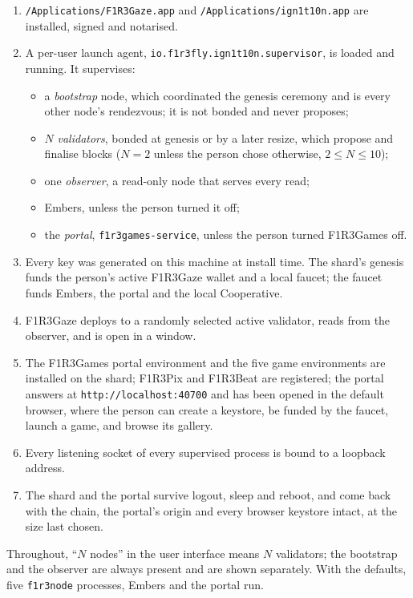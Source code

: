\documentclass[11pt]{article}
\theoremstyle{definition}
\theoremstyle{remark}
\newcommand{\code}[1]{\texttt{#1}}
\newcommand{\Gz}{F1R3Gaze}
\newcommand{\Gm}{F1R3Games}
\newcommand{\Svc}{\code{f1r3games-service}}
\newcommand{\Em}{Embers}
\begin{document}
\begin{enumerate}[nosep]
\item \code{/Applications/F1R3Gaze.app} and \code{/Applications/ign1t10n.app} are
  installed, signed and notarised.
\item A per-user launch agent, \code{io.f1r3fly.ign1t10n.supervisor}, is loaded and
  running. It supervises:
  \begin{itemize}[nosep]
  \item a \emph{bootstrap} node, which coordinated the genesis ceremony and is every
    other node's rendezvous; it is not bonded and never proposes;
  \item $N$ \emph{validators}, bonded at genesis or by a later resize, which propose
    and finalise blocks ($N = 2$ unless the person chose otherwise, $2 \le N \le 10$);
  \item one \emph{observer}, a read-only node that serves every read;
  \item \Em{}, unless the person turned it off;
  \item the \emph{portal}, \Svc{}, unless the person turned \Gm{} off.
  \end{itemize}
\item Every key was generated on this machine at install time. The shard's genesis
  funds the person's active \Gz{} wallet and a local faucet; the faucet funds \Em{},
  the portal and the local Cooperative.
\item \Gz{} deploys to a randomly selected active validator, reads from the observer,
  and is open in a window.
\item The \Gm{} portal environment and the five game environments are installed on
  the shard; F1R3Pix and F1R3Beat are registered; the portal answers at
  \code{http://localhost:40700} and has been opened in the default browser, where the
  person can create a keystore, be funded by the faucet, launch a game, and browse its
  gallery.
\item Every listening socket of every supervised process is bound to a loopback
  address.
\item The shard and the portal survive logout, sleep and reboot, and come back with
  the chain, the portal's origin and every browser keystore intact, at the size last
  chosen.
\end{enumerate}

\noindent
Throughout, ``$N$ nodes'' in the user interface means $N$ validators; the bootstrap
and the observer are always present and are shown separately. With the defaults,
five \code{f1r3node} processes, \Em{} and the portal run.
\end{document}
